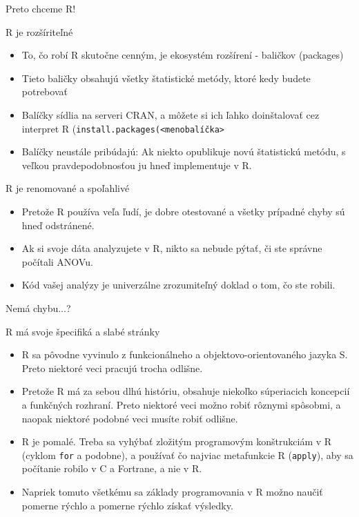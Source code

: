 \begin{frame}{Preto chceme R!}
	\begin{block}{R je rozšíriteľné}
		\begin{itemize}
			\item To, čo robí R skutočne cenným, je ekosystém rozšírení - baličkov (packages)
			\item Tieto baličky obsahujú všetky štatistické metódy, ktoré kedy budete potrebovať
			\item Balíčky sídlia na serveri CRAN, a môžete si ich ľahko doinštalovať cez interpret R (\texttt{install.packages(<menobalíčka>}
			\item Balíčky neustále pribúdajú: Ak niekto opublikuje novú štatistickú metódu, s veľkou pravdepodobnosťou ju hneď implementuje v R.
		\end{itemize}
	\end{block}
	\begin{block}{R je renomované a spoľahlivé}
		\begin{itemize}
			\item Pretože R používa veľa ľudí, je dobre otestované a všetky prípadné chyby sú hneď odstránené.
			\item Ak si svoje dáta analyzujete v R, nikto sa nebude pýtať, či ste správne počítali ANOVu.
			\item Kód vašej analýzy je univerzálne zrozumiteľný doklad o tom, čo ste robili.
		\end{itemize}
	\end{block}
\end{frame}

\begin{frame}{Nemá chybu...?}
	\begin{block}{R má svoje špecifiká a slabé stránky}
		\begin{itemize}
			\item R sa pôvodne vyvinulo z funkcionálneho a objektovo-orientovaného jazyka S. Preto niektoré veci pracujú trocha odlišne.
			\item Pretože R má za sebou dlhú históriu, obsahuje niekoľko súperiacich koncepcií a funkčných rozhraní. Preto niektoré veci možno robiť rôznymi spôsobmi, a naopak niektoré podobné veci musíte robiť odlišne.
			\item R je pomalé. Treba sa vyhýbať zložitým programovým konštrukciám v R (cyklom \texttt{for} a podobne), a používať čo najviac metafunkcie R (\texttt{apply}), aby sa počítanie robilo v C a Fortrane, a nie v R. 
			\item Napriek tomuto všetkému sa základy programovania v R možno naučiť pomerne rýchlo a pomerne rýchlo získať výsledky.
		\end{itemize}
	\end{block}
\end{frame}
